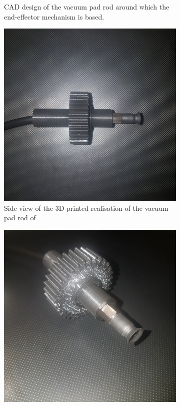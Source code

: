\begin{figure}[H]
\begin{subfigure}[b]{0.45\textwidth}
        \caption{\ac{CAD} design of the vacuum pad rod around which the end-effector mechanism is based.}
        \label{fig:vacuum-pad-rod-cad}
    \end{subfigure}
    \begin{subfigure}[b]{0.45\textwidth}
        \includegraphics[width=\textwidth]{figures/202106/vacuum-pad-rod-photo-side.jpg}
        \caption{Side view of the 3D printed realisation of the vacuum pad rod of }
        \label{fig:vacuum-pad-rod-photo-side}
    \end{subfigure}
    \begin{subfigure}[b]{0.45\textwidth}
        \includegraphics[width=\textwidth]{figures/202106/vacuum-pad-rod-photo-angle.jpg}

\end{subfigure}
\end{figure}
